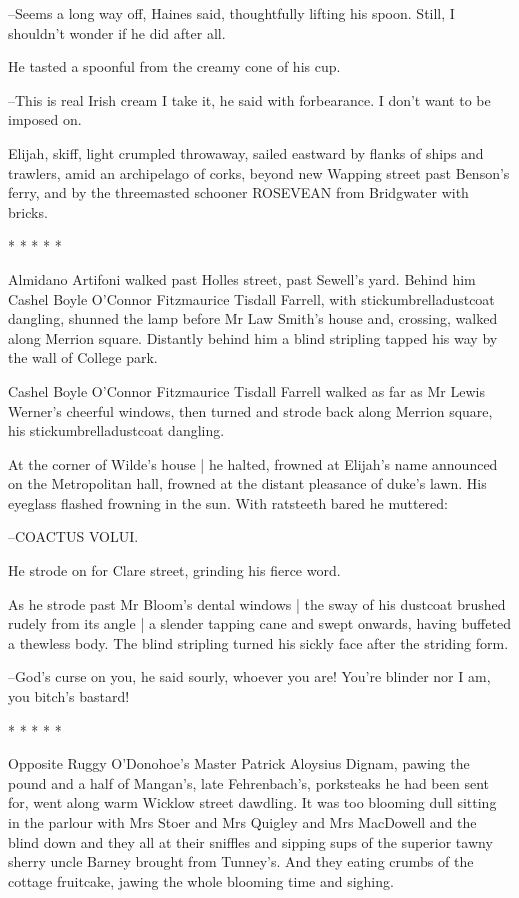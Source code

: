 --Seems a long way off,
Haines said,
thoughtfully lifting his spoon.
Still, I shouldn't wonder if he did after all.

He tasted a spoonful from the creamy cone of his cup.

--This is real Irish cream I take it,
he said with forbearance.
I don't want to be imposed on.

Elijah,
skiff,
light crumpled throwaway,
sailed eastward by flanks of
ships and trawlers,
amid an archipelago of corks,
beyond new Wapping
street
past Benson's ferry,
and by the threemasted schooner ROSEVEAN from
Bridgwater with bricks.


    * * * * *


Almidano Artifoni walked past Holles street,
past Sewell's yard.
Behind him
Cashel Boyle O'Connor Fitzmaurice Tisdall Farrell,
with
stickumbrelladustcoat dangling,
shunned the lamp before Mr Law Smith's
house
and, crossing, walked along Merrion square.
Distantly behind him a
blind stripling
tapped his way by the wall of College park.

Cashel Boyle O'Connor Fitzmaurice Tisdall Farrell
walked as far as
Mr Lewis Werner's cheerful windows,
then turned and strode back along
Merrion square,
his stickumbrelladustcoat dangling.

At the corner of Wilde's house |
he halted,
frowned at Elijah's name announced on the Metropolitan hall,
frowned at the distant pleasance of duke's lawn.
His eyeglass flashed frowning in the sun.
With ratsteeth bared he muttered:

--COACTUS VOLUI.

He strode on for Clare street,
grinding his fierce word.

As he strode past Mr Bloom's dental windows |
the sway of his dustcoat brushed rudely from its angle |
a slender tapping cane and swept onwards,
having buffeted a thewless body.
The blind stripling turned his sickly face after the striding form.

--God's curse on you,
he said sourly,
whoever you are!
You're blinder nor I am,
you bitch's bastard!


    * * * * *


Opposite Ruggy O'Donohoe's
Master Patrick Aloysius Dignam,
pawing the pound and a half of Mangan's,
late Fehrenbach's,
porksteaks he
had been sent for,
went along warm Wicklow street dawdling.
It was too
blooming dull sitting in the parlour
with Mrs Stoer and Mrs Quigley and
Mrs MacDowell
and the blind down
and they all at their sniffles
and
sipping sups of the superior tawny sherry
uncle Barney brought from
Tunney's.
And they eating crumbs of the cottage fruitcake,
jawing the
whole blooming time and sighing.

